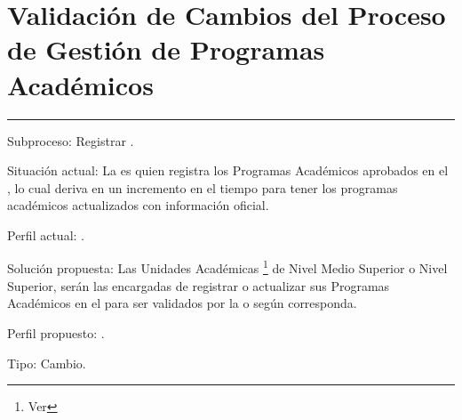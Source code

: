 \section{Validación de Cambios del Proceso de Gestión de Programas Académicos}
\label{section:PF-GPA:validacion}
\hrule
\vspace{0.2cm}
\begin{Cdescription}
	\item[Subproceso:] Registrar .
	\item[Situación actual:] La  es quien registra los Programas Académicos aprobados en el , lo cual deriva en un incremento en el tiempo para tener los programas académicos actualizados con información oficial.
	\item[Perfil actual:] .
	\item[Solución propuesta:] Las Unidades Académicas \footnote{ Ver } de Nivel Medio Superior o Nivel Superior, serán las encargadas de registrar o actualizar sus Programas Académicos en el  para ser validados por la  o  según corresponda.
	\item[Perfil propuesto:] .
	\item[Tipo:] Cambio.\\

\end{Cdescription}